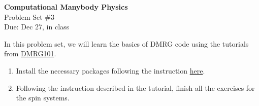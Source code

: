 \documentclass[12pt]{article}
\begin{document}
\begin{center}
\Large
\textbf{Computational Manybody Physics}\\
\large
Problem Set \#3\\
Due: Dec 27, in class

\end{center}

In this problem set, we will learn the basics of DMRG code using the tutorials from
 \href{http://dmrg101_tutorial.readthedocs.org/en/latest/index.html}{DMRG101}.
\begin{enumerate}
\item Install the necessary packages following the instruction  \href{https://sites.google.com/site/dmrg101/tutorial}{here}.
\item Following the instruction described in the tutorial, finish all the exercises for the spin systems.
\end{enumerate}
\end{document}
